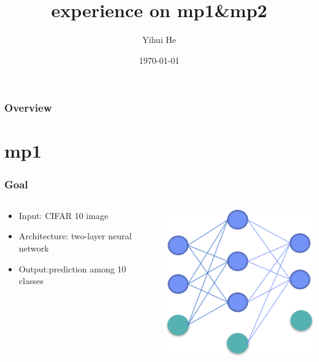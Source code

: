 \documentclass{beamer}
\title[mp1\&mp2 experience share]{experience on mp1\&mp2} %
\author{Yihui He}
\institute[ ] %
{
\medskip
\textit{yihuihe@foxmail.com}
}\date{\today}
\begin{document}
\begin{frame}
\titlepage
\end{frame}
\begin{frame}
\frametitle{Overview}
\tableofcontents
\end{frame}


\section{mp1}
\begin{frame}
\frametitle{Goal}
\begin{columns}
\begin{column}{.5\textwidth}
\begin{itemize}
\item Input: CIFAR 10 image
\item Architecture: two-layer neural network
\item Output:prediction among 10 classes
\end{itemize}
\end{column}
\begin{column}{.45\textwidth}
\includegraphics[width=\textwidth]{mp1.png}
\end{column}
\end{columns}



\end{frame}
\end{document}
